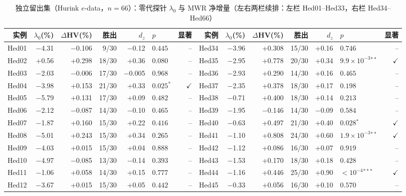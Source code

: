 \begin{table}[htbp]
  \centering
  \caption{独立留出集（Hurink $e$-data，$n=66$）：零代探针 $\lambda_0$ 与 MWR 净增量（左右两栏续排：左栏 Hed01--Hed33，右栏 Hed34--Hed66）}
  \label{tab:hurink}
  \scriptsize
  {\setlength{\tabcolsep}{2.6pt}%
  \begin{tabular}{rrrrrlr@{\hspace{6pt}}rrrrrlr}
    \toprule
    实例 & $\lambda_0$(\%) & $\Delta$HV(\%) & 胜出 & $d_z$ & $p$ & 显著 & 实例 & $\lambda_0$(\%) & $\Delta$HV(\%) & 胜出 & $d_z$ & $p$ & 显著 \\
    \midrule
    Hed01 & −4.31 & −0.106 & 9/30 & −0.12 & $0.445$ & -- & Hed34 & −3.96 & +0.308 & 15/30 & +0.16 & $0.746$ & -- \\
    Hed02 & +0.56 & +0.298 & 18/30 & +0.36 & $0.080$ & -- & Hed35 & −2.95 & +0.778 & 20/30 & +0.34 & $9.9\times 10^{-3}{}^{**}$ & $\checkmark$ \\
    Hed03 & −2.03 & −0.006 & 17/30 & −0.005 & $0.968$ & -- & Hed36 & −2.93 & +0.290 & 14/30 & +0.16 & $0.465$ & -- \\
    Hed04 & −3.98 & +0.153 & 21/30 & +0.33 & $0.025{}^{*}$ & $\checkmark$ & Hed37 & −2.35 & +0.378 & 18/30 & +0.17 & $0.198$ & -- \\
    Hed05 & −5.79 & +0.131 & 17/30 & +0.09 & $0.482$ & -- & Hed38 & −0.71 & +0.400 & 18/30 & +0.14 & $0.213$ & -- \\
    Hed06 & −2.12 & −0.087 & 14/30 & −0.10 & $0.465$ & -- & Hed39 & −1.95 & −0.146 & 14/30 & −0.09 & $0.584$ & -- \\
    Hed07 & −1.87 & +0.160 & 15/30 & +0.22 & $0.416$ & -- & Hed40 & −0.63 & +0.497 & 21/30 & +0.40 & $0.028{}^{*}$ & $\checkmark$ \\
    Hed08 & −5.01 & +0.243 & 15/30 & +0.34 & $0.265$ & -- & Hed41 & −1.10 & +0.808 & 24/30 & +0.60 & $1.9\times 10^{-3}{}^{**}$ & $\checkmark$ \\
    Hed09 & −4.03 & +0.015 & 15/30 & +0.04 & $0.888$ & -- & Hed42 & −1.12 & +0.086 & 16/30 & +0.07 & $0.919$ & -- \\
    Hed10 & −4.97 & −0.085 & 13/30 & −0.14 & $0.393$ & -- & Hed43 & −1.53 & +0.170 & 18/30 & +0.18 & $0.428$ & -- \\
    Hed11 & −1.06 & +0.058 & 14/30 & +0.15 & $0.777$ & -- & Hed44 & −1.16 & +0.446 & 25/30 & +0.90 & $<10^{-4}{}^{***}$ & $\checkmark$ \\
    Hed12 & −3.67 & +0.015 & 15/30 & +0.05 & $0.442$ & -- & Hed45 & −0.33 & +0.056 & 16/30 & +0.10 & $0.570$ & -- \\

\end{tabular}}
\end{table}
